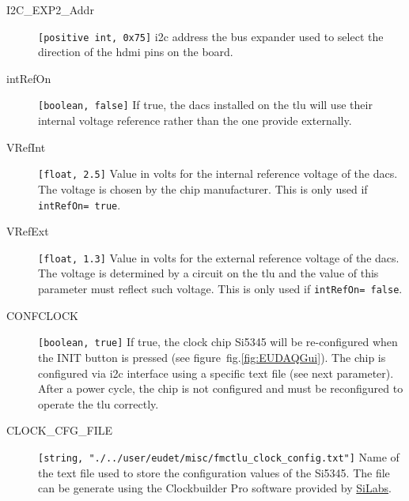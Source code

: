 \begin{description}
  \item[I2C\_EXP2\_Addr] \verb|[positive int, 0x75]| \gls{i2c} address the bus expander used to select the direction of the \gls{hdmi} pins on the board.
  \item[intRefOn] \verb|[boolean, false]| If true, the \gls{dac}s installed on the \gls{tlu} will use their internal voltage reference rather than the one provide externally.
  \item[VRefInt] \verb|[float, 2.5]| Value in volts for the internal reference voltage of the \gls{dac}s. The voltage is chosen by the chip manufacturer. This is only used if \verb|intRefOn= true|.
  \item[VRefExt] \verb|[float, 1.3]| Value in volts for the external reference voltage of the \gls{dac}s. The voltage is determined by a circuit on the \gls{tlu} and the value of this parameter must reflect such voltage. This is only used if \verb|intRefOn= false|.
  \item[CONFCLOCK] \verb|[boolean, true]| If true, the clock chip Si5345 will be re-configured when the INIT button is pressed (see figure~fig.\ref{fig:EUDAQGui}). The chip is configured via \gls{i2c} interface using a specific text file (see next parameter). After a power cycle, the chip is not configured and must be reconfigured to operate the \gls{tlu} correctly.
  \item[CLOCK\_CFG\_FILE] \verb|[string, "./../user/eudet/misc/fmctlu_clock_config.txt"]| Name of the text file used to store the configuration values of the Si5345. The file can be generate using the Clockbuilder Pro software provided by \href{https://www.silabs.com/products/development-tools/software/clock}{SiLabs}.
\end{description}

